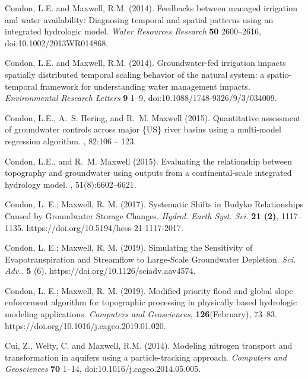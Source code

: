 \begin{thebibliography}{999}
Condon, L.E. and Maxwell, R.M. (2014). Feedbacks between managed irrigation and water availability: Diagnosing temporal and spatial patterns using an integrated hydrologic model. {\em Water Resources Research} {\bf 50} 2600--2616, doi:10.1002/2013WR014868.

Condon, L.E. and Maxwell, R.M. (2014). Groundwater-fed irrigation impacts spatially distributed temporal scaling behavior of the natural system: a spatio-temporal framework for understanding water management impacts. {\em Environmental Research Letters} {\bf 9} 1--9, doi:10.1088/1748-9326/9/3/034009.

 Condon, L.E., A.~S. Hering, and R.~M. Maxwell (2015).
\newblock Quantitative assessment of groundwater controls across major \{US\}
  river basins using a multi-model regression algorithm.
, 82:106 -- 123.

Condon, L.E., and R.~M. Maxwell (2015).
\newblock Evaluating the relationship between topography and groundwater using
  outputs from a continental-scale integrated hydrology model.
, 51(8):6602--6621.


Condon, L. E.; Maxwell, R. M. (2017). Systematic Shifts in Budyko Relationships Caused by Groundwater Storage Changes. {\em Hydrol. Earth Syst. Sci.} {\bf 21 (2)}, 1117–1135. https://doi.org/10.5194/hess-21-1117-2017.


Condon, L. E.; Maxwell, R. M. (2019). Simulating the Sensitivity of Evapotranspiration and Streamflow to Large-Scale Groundwater Depletion. {\em Sci. Adv.}. {\bf 5} (6). https://doi.org/10.1126/sciadv.aav4574.

Condon, L. E.; Maxwell, R. M. (2019). Modified priority flood and global slope enforcement algorithm for topographic processing in physically based hydrologic modeling applications. {\em Computers and Geosciences}, {\bf 126}(February), 73–83. https://doi.org/10.1016/j.cageo.2019.01.020.



Cui, Z., Welty, C. and Maxwell, R.M. (2014). 
\newblock Modeling nitrogen transport and transformation in aquifers using a particle-tracking approach. {\em Computers and Geosciences} {\bf 70} 1--14, doi:10.1016/j.cageo.2014.05.005.


\end{thebibliography}
